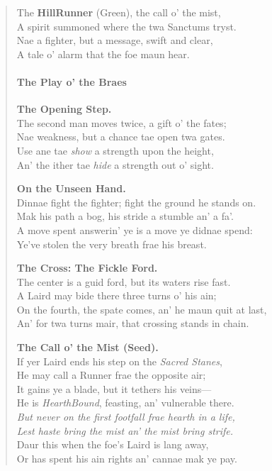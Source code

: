 \documentclass[11pt]{article}
\begin{document}
\begin{quote}
The \textbf{Hill\textendash Runner} (Green), the call o' the mist,\\
A spirit summoned where the twa Sanctums tryst.\\
Nae a fighter, but a message, swift and clear,\\
A tale o' alarm that the foe maun hear.

\paragraph{The Play o' the Braes}
\textbf{The Opening Step.}\\
The second man moves twice, a gift o' the fates;\\
Nae weakness, but a chance tae open twa gates.\\
Use ane tae \emph{show} a strength upon the height,\\
An' the ither tae \emph{hide} a strength out o' sight.

\textbf{On the Unseen Hand.}\\
Dinnae fight the fighter; fight the ground he stands on.\\
Mak his path a bog, his stride a stumble an' a fa'.\\
A move spent answerin' ye is a move ye didnae spend:\\
Ye've stolen the very breath frae his breast.

\textbf{The Cross: The Fickle Ford.}\\
The center is a guid ford, but its waters rise fast.\\
A Laird may bide there three turns o' his ain;\\
On the fourth, the spate comes, an' he maun quit at last,\\
An' for twa turns mair, that crossing stands in chain.

\textbf{The Call o' the Mist (Seed).}\\
If yer Laird ends his step on the \emph{Sacred Stanes},\\
He may call a Runner frae the opposite air;\\
It gains ye a blade, but it tethers his veins---\\
He is \emph{Hearth\textendash Bound}, feasting, an' vulnerable there.\\
\emph{But never on the first footfall frae hearth in a life,}\\
\emph{Lest haste bring the mist an' the mist bring strife.}\\
Daur this when the foe's Laird is lang away,\\
Or has spent his ain rights an' cannae mak ye pay.


\end{quote}
\end{document}
